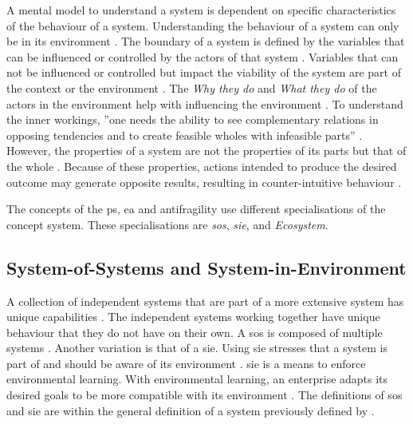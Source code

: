 A mental model to understand a system is dependent on specific characteristics of the behaviour of a system. Understanding the behaviour of a system can only be in its environment \parencite[p.~29]{Gharajedaghi2011}. The boundary of a system is defined by the variables that can be influenced or controlled by the actors of that system \parencite[p.~182]{Gharajedaghi2011}. Variables that can not be influenced or controlled but impact the viability of the system are part of the context \parencite[p.~183]{Gharajedaghi2011} or the environment \parencite[p.~13--14]{Mannaert2016}. The \textit{Why they do} and \textit{What they do} of the actors in the environment help with influencing the environment \parencite[p.~33]{Gharajedaghi2011}. To understand the inner workings, ''one needs the ability to see complementary relations in opposing tendencies and to create feasible wholes with infeasible parts'' \parencite[p.~38]{Gharajedaghi2011}. However, the properties of a system are not the properties of its parts but that of the whole \parencites{Ackoff1973}{Gharajedaghi2011}. Because of these properties, actions intended to produce the desired outcome may generate opposite results, resulting in counter-intuitive behaviour \parencite[p.~48]{Gharajedaghi2011}.

The concepts of the \gls{ps}, \acrshort{ea} and \gls{antifragility} use different \glspl{specialisation} of the concept system. These \glspl{specialisation} are \textit{\gls{sos}}, \textit{\gls{sie}}, and \textit{Ecosystem}.
\subsection{System-of-Systems and System-in-Environment}
\label{sub:tbsysofsys}
A collection of independent systems that are part of a more extensive system has unique capabilities \parencite{INCOSE2018}. The independent systems working together have unique behaviour that they do not have on their own.  A \gls{sos} is composed of multiple systems \parencites{Ackoff1973}{Gharajedaghi2011}. Another variation is that of a \gls{sie}. Using \gls{sie} stresses that a system is part of and should be aware of its environment \parencites{Gharajedaghi2011}{Lapalme2012}{Korhonen2016}{Mannaert2016}. \gls{sie} is a means to enforce environmental learning. With environmental learning, an enterprise adapts its desired goals to be more compatible with its environment \parencite[p.~41]{Lapalme2012}. The definitions of \gls{sos} and \gls{sie} are within the general definition of a system previously defined by \textcites{Ackoff1973}[p.~183]{Gharajedaghi2011}[pp.~13--14]{Mannaert2016}.

